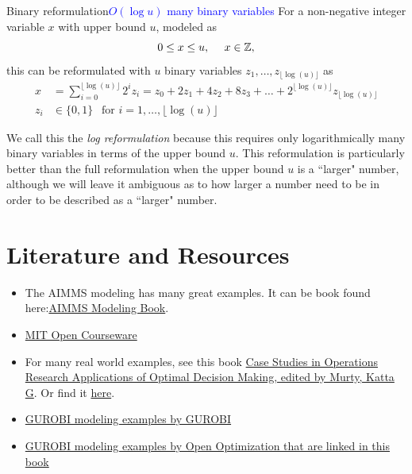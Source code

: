 {\begin{general}{Binary reformulation}{\textcolor{blue}{$O(\log u)$ many binary variables}}
\label{general:log-reformulation}
For a non-negative integer variable $x$ with upper bound $u$, modeled as 
\begin{equation}
0 \leq x \leq u, \ \ \ \ x \in {\mathbb{Z}},
\end{equation}
this can be reformulated with $u$ binary variables $z_1, \dots, z_{\lfloor\log( u )\rfloor}$ as 
\begin{equation}
\begin{split}
x & = \sum_{i=0}^{\lfloor\log( u )\rfloor}2^i z_i = z_0 + 2 z_1 +  4 z_2 + 8 z_3 + \dots + 2^{\lfloor\log( u )\rfloor} z_{\lfloor\log( u )\rfloor}\\
z_i & \in \{0,1\} \ \ \text{ for } i=1, \dots, \lfloor\log( u )\rfloor
\end{split}
\end{equation}
\end{general}
We call this the \emph{log reformulation} because this requires only logarithmically many binary variables in terms of the upper bound $u$.   This reformulation is particularly better than the full reformulation when the upper bound $u$ is a ``larger" number, although we will leave it ambiguous as to how larger a number need to be in order to be described as a ``larger" number. 

\section{Literature and Resources}

\begin{resource}



\begin{itemize}
\item The AIMMS modeling has many great examples.  It can be book found here:\href{https://www.aimms.com/english/developers/resources/manuals/optimization-modeling}{AIMMS Modeling Book}.
\item \href{http://web.mit.edu/15.053/www/AMP-Chapter-09.pdf}{MIT Open Courseware}
\item  For many real world examples, see this book \href{https://link-springer-com.ezproxy.lib.vt.edu/book/10.1007/978-1-4939-1007-6}{
Case Studies in Operations Research
Applications of Optimal Decision Making, edited by  Murty, Katta G}.
Or find it \href{https://www.springer.com/gp/book/9781493910069}{here}.
\item \href{https://github.com/Gurobi/modeling-examples}{GUROBI modeling examples by GUROBI}
\item \href{https://github.com/open-optimization/open-optimization-or-examples/tree/master/integer-programming}{GUROBI modeling examples by Open Optimization that are linked in this book}
\end{itemize}


\end{resource}}
